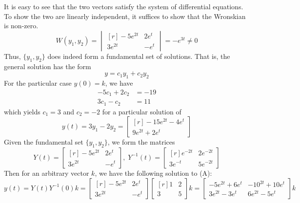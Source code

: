\documentclass[11pt, titlepage]{article}
\begin{document}
  \begin{solution}
    It is easy to see that the two vectors satisfy the system of differential equations.
    To show the two are linearly independent, it suffices to show that the Wronskian is non-zero.
    \begin{equation*}
      W(y_{1}, y_{2}) =
      \begin{vmatrix*}[r]
        -5e^{2t} & 2e^{t} \\
        3e^{2t} & -e^{t}
      \end{vmatrix*}
      = -e^{3t} \neq 0
    \end{equation*}
    Thus, \(\{y_{1}, y_{2}\}\) does indeed form a fundamental set of solutions.
    That is, the general solution has the form
    \begin{equation*}
      y = c_{1} y_{1} + c_{2} y_{2}
    \end{equation*}
    For the particular case \(y(0) = k\), we have
    \begin{align*}
      -5 c_{1} +  2c_{2} &= -19 \\
      3 c_{1} - c_{2} &= 11
    \end{align*}
    which yields \(c_{1} = 3\) and \(c_{2} = -2\) for a particular solution of
    \begin{equation*}
      y(t) = 3 y_{1} - 2 y_{2} =
      \begin{bmatrix*}[r]
        -15e^{2t} - 4e^{t} \\
        9e^{2t} + 2e^{t}
      \end{bmatrix*}
    \end{equation*}
    Given the fundamental set \(\{y_{1}, y_{2}\}\), we form the matrices
    \begin{equation*}
      Y(t) =
      \begin{bmatrix*}[r]
        -5e^{2t} & 2e^{t} \\
        3e^{2t} & -e^{t}
      \end{bmatrix*}, \;
      Y^{-1}(t) =
      \begin{bmatrix*}[r]
        e^{-2t} & 2e^{-2t} \\
        3e^{-t} & 5e^{-2t}
      \end{bmatrix*}
    \end{equation*}
    Then for an arbitrary vector \(k\), we have the following solution to (A):
    \begin{equation*}
      y(t) = Y(t) Y^{-1}(0) k =
      \begin{bmatrix*}[r]
        -5e^{2t} & 2e^{t} \\
        3e^{2t} & -e^{t}
      \end{bmatrix*}
      \begin{bmatrix*}[r]
        1 & 2 \\
        3 & 5
      \end{bmatrix*} k
      =
      \begin{bmatrix*}
        -5e^{2t} + 6e^{t} & -10^{2t} + 10e^{t} \\
        3e^{2t} - 3e^{t} & 6e^{2t} - 5e^{t}
      \end{bmatrix*} k
    \end{equation*}
  \end{solution}
\end{document}
